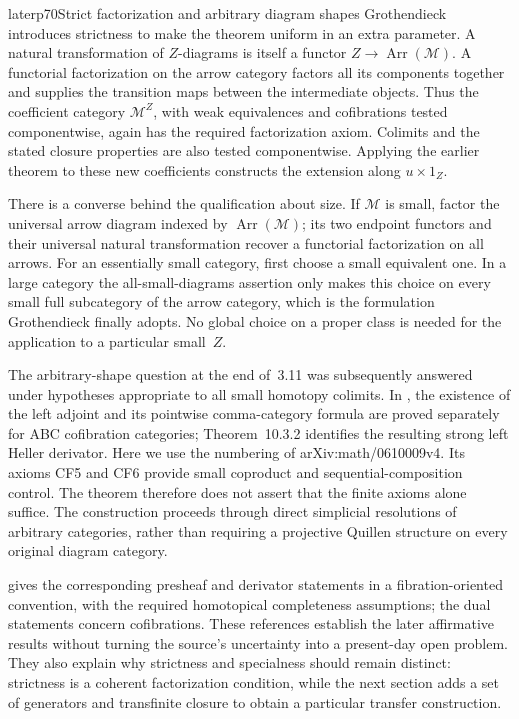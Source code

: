 \begin{dcomment}{later}{p70}{Strict factorization and arbitrary diagram shapes}
Grothendieck introduces strictness to make the theorem uniform in an extra parameter. A natural transformation of $Z$-diagrams is itself a functor $Z\to\operatorname{Arr}(\mathcal M)$. A functorial factorization on the arrow category factors all its components together and supplies the transition maps between the intermediate objects. Thus the coefficient category $\mathcal M^Z$, with weak equivalences and cofibrations tested componentwise, again has the required factorization axiom. Colimits and the stated closure properties are also tested componentwise. Applying the earlier theorem to these new coefficients constructs the extension along $u\times1_Z$.

There is a converse behind the qualification about size. If $\mathcal M$ is small, factor the universal arrow diagram indexed by $\operatorname{Arr}(\mathcal M)$; its two endpoint functors and their universal natural transformation recover a functorial factorization on all arrows. For an essentially small category, first choose a small equivalent one. In a large category the all-small-diagrams assertion only makes this choice on every small full subcategory of the arrow category, which is the formulation Grothendieck finally adopts. No global choice on a proper class is needed for the application to a particular small~$Z$.

The arbitrary-shape question at the end of~3.11 was subsequently answered under hypotheses appropriate to all small homotopy colimits. In \citet[Theorems~9.6.3 and~9.6.5]{RadulescuBanu2009}, the existence of the left adjoint and its pointwise comma-category formula are proved separately for ABC cofibration categories; Theorem~10.3.2 identifies the resulting strong left Heller derivator. Here we use the numbering of arXiv:math/0610009v4. Its axioms CF5 and CF6 provide small coproduct and sequential-composition control. The theorem therefore does not assert that the finite axioms alone suffice. The construction proceeds through direct simplicial resolutions of arbitrary categories, rather than requiring a projective Quillen structure on every original diagram category.

\citet[Theorem~6.11 and Corollary~6.21]{Cisinski2010} gives the corresponding presheaf and derivator statements in a fibration-oriented convention, with the required homotopical completeness assumptions; the dual statements concern cofibrations. These references establish the later affirmative results without turning the source's uncertainty into a present-day open problem. They also explain why strictness and specialness should remain distinct: strictness is a coherent factorization condition, while the next section adds a set of generators and transfinite closure to obtain a particular transfer construction.
\end{dcomment}

